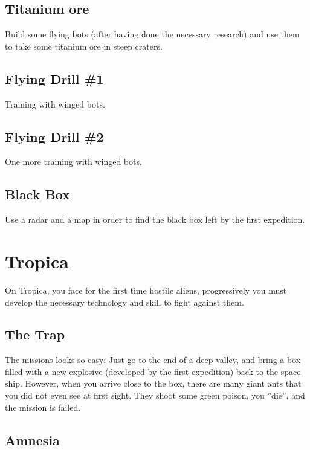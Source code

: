 \subsection{Titanium ore}

Build some flying bots (after having done the necessary research) and use them to take some titanium ore in steep craters.


\subsection{Flying Drill \#1}

Training with winged bots.


\subsection{Flying Drill \#2}

One more training with winged bots.


\subsection{Black Box}

Use a radar and a map in order to find the black box left by the first expedition.


\newpage
\section{Tropica}

On Tropica, you face for the first time hostile aliens, progressively you must develop the necessary technology and skill to fight against them.


\subsection{The Trap}

The missions looks so easy: Just go to the end of a deep valley, and bring a box filled with a new explosive (developed by the first expedition) back to the space ship. However, when you arrive close to the box, there are many giant ants that you did not even see at first sight. They shoot some green poison, you ''die'', and the mission is failed.


\subsection{Amnesia}

